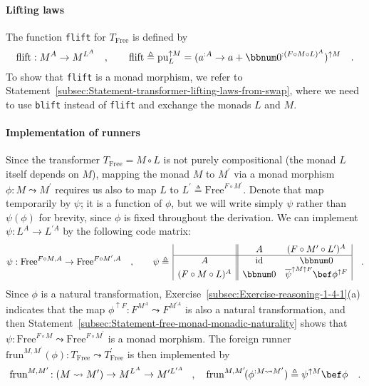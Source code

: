 \paragraph{Lifting laws}

The function \lstinline!flift! for $T_{\text{Free}}$ is defined
by
\[
\text{flift}:M^{A}\rightarrow M^{L^{A}}\quad,\quad\quad\text{flift}\triangleq\text{pu}_{L}^{\uparrow M}=(a^{:A}\rightarrow a+\bbnum 0^{:(F\circ M\circ L)^{A}})^{\uparrow M}\quad.
\]
To show that \lstinline!flift! is a monad morphism, we refer to Statement~\ref{subsec:Statement-transformer-lifting-laws-from-swap},
where we need to use \lstinline!blift! instead of \lstinline!flift!
and exchange the monads $L$ and $M$.

\paragraph{Implementation of runners}

Since the transformer $T_{\text{Free}}=M\circ L$ is not purely compositional
(the monad $L$ itself depends on $M$), mapping the monad $M$ to
$M^{\prime}$ via a monad morphism $\phi:M\leadsto M^{\prime}$ requires
us also to map $L$ to $L^{\prime}\triangleq\text{Free}^{F\circ M^{\prime}}$.
Denote that map temporarily by $\psi$; it is a function of $\phi$,
but we will write simply $\psi$ rather than $\psi(\phi)$ for brevity,
since $\phi$ is fixed throughout the derivation. We can implement
$\psi:L^{A}\rightarrow L^{\prime A}$ by the following code matrix:
\begin{equation}
\psi:\text{Free}^{F\circ M,A}\rightarrow\text{Free}^{F\circ M^{\prime},A}\quad,\quad\quad\psi\triangleq\,\begin{array}{|c||cc|}
 & A & (F\circ M^{\prime}\circ L^{\prime})^{A}\\
\hline A & \text{id} & \bbnum 0\\
(F\circ M\circ L)^{A} & \bbnum 0 & \overline{\psi}^{\uparrow M\uparrow F}\bef\phi^{\uparrow F}
\end{array}\quad.\label{eq:free-monad-definition-of-psi}
\end{equation}
Since $\phi$ is a natural transformation, Exercise~\ref{subsec:Exercise-reasoning-1-4-1}(a)
indicates that the map $\phi^{\uparrow F}:F^{M^{A}}\leadsto F^{M^{\prime A}}$
is also a natural transformation, and then Statement~\ref{subsec:Statement-free-monad-monadic-naturality}
shows that $\psi:\text{Free}^{F\circ M}\leadsto\text{Free}^{F\circ M^{\prime}}$
is a monad morphism. The foreign runner $\text{frun}^{M,M^{\prime}}(\phi):T_{\text{Free}}\leadsto T_{\text{Free}}^{\prime}$
is then implemented by
\[
\text{frun}^{M,M^{\prime}}\!:\left(M\leadsto M^{\prime}\right)\rightarrow M^{L^{A}}\rightarrow M^{\prime L^{\prime A}}\!\quad,\quad\text{frun}^{M,M^{\prime}}\!(\phi^{:M\leadsto M^{\prime}})\triangleq\psi^{\uparrow M}\bef\phi\quad.
\]


